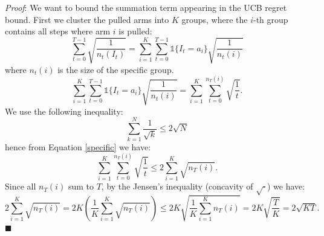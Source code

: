 \documentclass[10pt, a4paper]{report}
\begin{document}
\noindent\textit{Proof}:  We want to bound the summation term appearing in the UCB regret bound. First we cluster the pulled arms into $K$ groups, where the $i$-th group contains all steps where arm $i$ is pulled:\begin{equation}
    \sum_{t=0}^{T-1}\sqrt{\frac{1}{n_t(I_t)}}=\sum_{i=1}^{K}\sum_{t=0}^{T-1}\mathbb{1}\{I_t=a_i\}\sqrt{\frac{1}{n_t(i)}}
\end{equation}
where $n_t(i)$ is the size of the specific group. \begin{equation}\label{specific}
    \sum_{i=1}^{K}\sum_{t=0}^{T-1}\mathbb{1}\{I_t=a_i\}\sqrt{\frac{1}{n_t(i)}}=
    \sum_{i=1}^{K}\sum_{t=0}^{n_T(i)}\sqrt{\frac{1}{t}}.
\end{equation}
We use the following inequality:\begin{equation}
    \sum_{k=1}^{N}\frac{1}{\sqrt{k}}\le2\sqrt{N}
\end{equation}
hence from Equation \eqref{specific} we have:\begin{equation}
     \sum_{i=1}^{K}\sum_{t=0}^{n_T(i)}\sqrt{\frac{1}{t}}\le  
     2\sum_{i=1}^{K}\sqrt{n_T(i)}.
\end{equation}
Since all $n_T(i)$ sum to $T$, by the Jensen's inequality (concavity of $\sqrt\cdot$) we have:\begin{equation}
    2\sum_{i=1}^{K}\sqrt{n_T(i)}=2K \left( \frac{1}{K} \sum_{i=1}^K \sqrt{n_T(i)} \right) \le2 K \sqrt{\frac{1}{K} \sum_{i=1}^K n_T(i)} = 2K \sqrt{\frac{T}{K}} = 2\sqrt{KT}.
\end{equation}
\hfill$\blacksquare$
\end{document}
